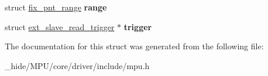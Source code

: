 \begin{DoxyCompactItemize}
\item 
\hypertarget{structext__slave__descr_a7ed42862d60a0cc46d314bf7299d4a29}{}struct \hyperlink{structfix__pnt__range}{fix\+\_\+pnt\+\_\+range} {\bfseries range}\label{structext__slave__descr_a7ed42862d60a0cc46d314bf7299d4a29}

\item 
\hypertarget{structext__slave__descr_a0d08e12c8d36faabe48047f0a775d6f1}{}struct \hyperlink{structext__slave__read__trigger}{ext\+\_\+slave\+\_\+read\+\_\+trigger} $\ast$ {\bfseries trigger}\label{structext__slave__descr_a0d08e12c8d36faabe48047f0a775d6f1}

\end{DoxyCompactItemize}


The documentation for this struct was generated from the following file\+:\begin{DoxyCompactItemize}
\item 
\+\_\+hide/\+M\+P\+U/core/driver/include/mpu.\+h\end{DoxyCompactItemize}
